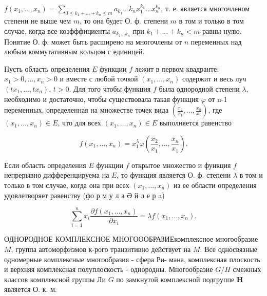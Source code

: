 \documentclass[10pt]{article}
\begin{document}
$f\left(x_{1}, \ldots, x_{n}\right)=\sum_{0 \leqslant k_{1}+\ldots+k_{n} \leqslant m} a_{k_{1}} \ldots k_{n} x_{1}^{k_{1}} \ldots x_{n}^{k_{n}}$, т. е. является многочленом степени не выше чем $m$, то она будет О. ф. степени $m$ в том и только в том случае, когда все коэфффициенты $a_{k_{1} \ldots k_{n}}$ при $k_{1}+\ldots+k_{n}<m$ равны нулю. Понятие О. ф. может быть расширено на многочлены от $n$ переменных над любым коммутативным кольцом с единицей.



Пусть область определения $E$ функции $f$ лежит в первом квадранте: $x_{1}>0, \ldots, x_{n}>0$ и вместе с любой точкой $\left(x_{1}, \ldots, x_{n}\right)$ содержит и весь луч $\left(t x_{1}, \ldots, t x_{n}\right)$, $t>0$. Для того чтобы функция $f$ была однородной степени $\lambda$, необходимо и достаточно, чтобы существовала такая функция $\varphi$ от n-1 переменных, определенная на множестве точек вида $\left(\frac{x_{2}}{x_{1}}, \ldots, \frac{x_{n}}{x_{1}}\right)$, где $\left(x_{1}, \ldots, x_{n}\right) \in E$, что для всех $\left(x_{1}, \ldots, x_{n}\right) \in E$ выполняется равенство



\[

f\left(x_{1}, \ldots, x_{n}\right)=x_{1}^{\lambda} \varphi\left(\frac{x_{2}}{x_{1}}, \ldots, \frac{x_{n}}{x_{1}}\right) .

\]



Если область определения $E$ функции $f$ открытое множество и функция $f$ непрерывно дифференцируема на $E$, то функция является О. ф. степени $\lambda$ в том и только в том случае, когда она при всех $\left(x_{1}, \ldots, x_{n}\right)$ из ее области определения удовлетворяет равенству (фо р м у л а Ә й л е р a)



\[

\sum_{i=1}^{n} x_{i} \frac{\partial f\left(x_{1}, \ldots, x_{n}\right)}{\partial x_{i}}=\lambda f\left(x_{1}, \ldots, x_{n}\right) .

\]



ОДНОРОДНОЕ КОМПЛЕКСНОЕ МНОГОООБРАЗИЕкомплексное многообразие $M$, группа автоморфизмов к-рого транзитивно действует на $M$. Все односвязные одномерные комплексные многообразия - сфера Ри- мана, комплексная плоскость и верхняя комплексная полуплоскость - однородны. Многообразие $G / H$ смежных классов комплексной группы Ли $G$ по замкнутой комплексной подгруппе $\boldsymbol{H}$ является О. к. м.
\end{document}
